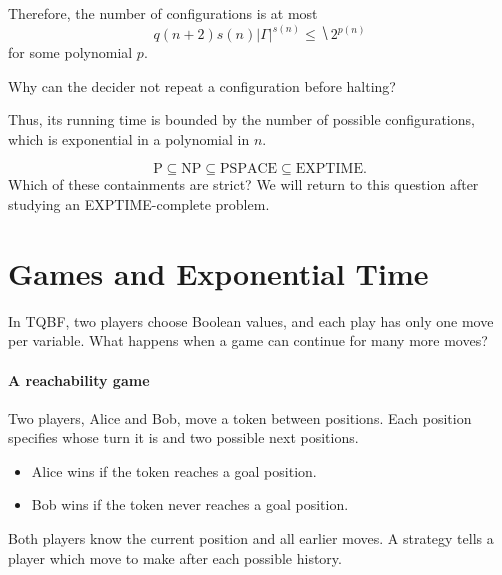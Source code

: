 \documentclass[11  pt]{article}
\begin{document}
Therefore, the number of configurations is at most
\begin{equation*}
    q(n+2)s(n)|\Gamma|^{s(n)}\leq\hide{2^{p(n)}}
\end{equation*}
for some polynomial $p$.

Why can the decider not repeat a configuration before halting?
\vs{1.5cm}

Thus, its running time is bounded by the number of possible configurations, which is exponential in a polynomial in $n$.


\begin{equation*}
    \mathrm{P}\subseteq\mathrm{NP}\subseteq\mathrm{PSPACE}\subseteq\mathrm{EXPTIME}.
\end{equation*}
Which of these containments are strict? We will return to this question after studying an EXPTIME-complete problem.

\newpage
\section{Games and Exponential Time}
In \textsc{TQBF}, two players choose Boolean values, and each play has only one move per variable. What happens when a game can continue for many more moves?

\paragraph{A reachability game}
Two players, Alice and Bob, move a token between positions. Each position specifies whose turn it is and two possible next positions.
\begin{itemize}
    \item Alice wins if the token reaches a goal position.
    \item Bob wins if the token never reaches a goal position.
\end{itemize}
Both players know the current position and all earlier moves. A strategy tells a player which move to make after each possible history.
\end{document}
